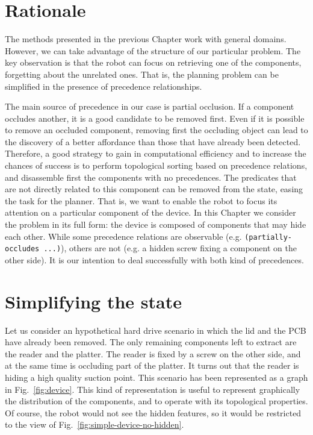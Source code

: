 \documentclass[../root.tex]{subfiles}
\begin{document}
\section{Rationale}

The methods presented in the previous Chapter work with general domains. However,
we can take advantage of the structure of our particular problem. The key observation
is that the robot can focus on retrieving one of the components, forgetting about the
unrelated ones. That is, the planning problem can be simplified in the presence of
precedence relationships.

The main source of precedence in our case is partial occlusion. If a component occludes
another, it is a good candidate to be removed first. Even if it is possible to remove
an occluded component, removing first the occluding object can lead to the discovery
of a better affordance than those that have already been detected.
Therefore, a good strategy to gain in computational efficiency and to increase the
chances of success is to
perform topological sorting based on precedence relations, and disassemble first the
components with no precedences. The predicates that are not directly related to this
component can be removed from the state, easing the task for the planner.
That is, we want to enable the robot to focus its attention on a particular component
of the device. In this Chapter we consider the problem in its full form: the device
is composed of components that may hide each other. While some precedence relations
are observable (e.g. \texttt{(partially-occludes ...)}), others are not (e.g.
a hidden screw fixing a component on the other side). It is our intention to deal
successfully with both kind of precedences.

\section{Simplifying the state}

Let us consider an hypothetical hard drive scenario in which the lid and the PCB have already
been removed. The only remaining components left to extract are the reader and the platter.
The reader is fixed by a screw on the other side, and at the same time is occluding part
of the platter. It turns out that the reader is hiding a high quality suction point. This
scenario has been represented as a graph in Fig.~\ref{fig:device}. This kind of representation
is useful to represent graphically the distribution of the components, and to operate with
its topological properties. Of course, the robot would not see the hidden features, so it would
be restricted to the view of Fig.~\ref{fig:simple-device-no-hidden}.
\end{document}
